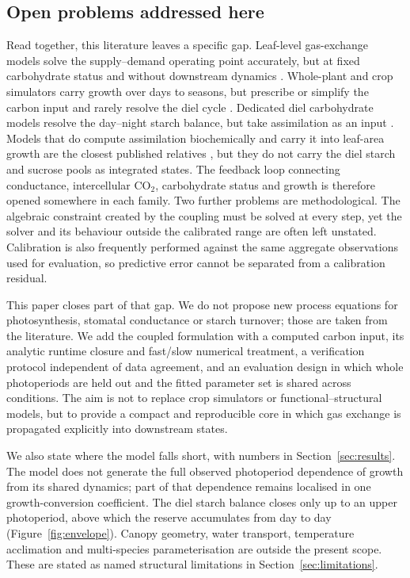 \subsection{Open problems addressed here}

Read together, this literature leaves a specific gap. Leaf-level gas-exchange
models solve the supply--demand operating point accurately, but at fixed
carbohydrate status and without downstream dynamics
\cite{Farquhar1980,Jarvis1976,vonCaemmerer2000}. Whole-plant and crop
simulators carry growth over days to seasons, but prescribe or simplify the
carbon input and rarely resolve the diel cycle
\cite{Jones2003,deWit2019,Holzworth2014}. Dedicated diel carbohydrate models
resolve the day--night starch balance, but take assimilation as an input
\cite{Scialdone2013,Graf2010}. Models that do compute assimilation
biochemically and carry it into leaf-area growth are the closest published
relatives \cite{Weraduwage2015}, but they do not carry the diel starch and
sucrose pools as integrated states. The feedback loop connecting conductance,
intercellular CO$_2$, carbohydrate status and growth is therefore opened
somewhere in each family. Two further problems are methodological. The algebraic
constraint created by the coupling must be solved at every step, yet the solver
and its behaviour outside the calibrated range are often left unstated.
Calibration is also frequently performed against the same aggregate observations
used for evaluation, so predictive error cannot be separated from a calibration
residual.

This paper closes part of that gap. We do not propose new process equations for
photosynthesis, stomatal conductance or starch turnover; those are taken from
the literature. We add the coupled formulation with a computed carbon input,
its analytic runtime closure and fast/slow numerical treatment, a verification
protocol independent of data agreement, and an evaluation design in which whole
photoperiods are held out and the fitted parameter set is shared across
conditions. The aim is not to replace crop simulators or
functional--structural models, but to provide a compact and reproducible core
in which gas exchange is propagated explicitly into downstream states.

We also state where the model falls short, with numbers in
Section~\ref{sec:results}. The model does not generate the full observed
photoperiod dependence of growth from its shared dynamics; part of that
dependence remains localised in one growth-conversion coefficient. The diel
starch balance closes only up to an upper photoperiod, above which the reserve
accumulates from day to day (Figure~\ref{fig:envelope}). Canopy geometry, water
transport, temperature acclimation and multi-species parameterisation are
outside the present scope. These are stated as named structural limitations in
Section~\ref{sec:limitations}.

